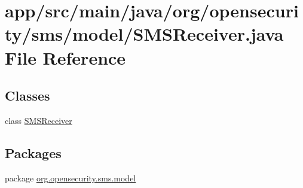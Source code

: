 \hypertarget{a00027}{\section{app/src/main/java/org/opensecurity/sms/model/\+S\+M\+S\+Receiver.java File Reference}
\label{a00027}
}
\subsection*{Classes}
\begin{DoxyCompactItemize}
\item 
class \hyperlink{a00015}{S\+M\+S\+Receiver}
\end{DoxyCompactItemize}
\subsection*{Packages}
\begin{DoxyCompactItemize}
\item 
package \hyperlink{a00035}{org.\+opensecurity.\+sms.\+model}
\end{DoxyCompactItemize}
